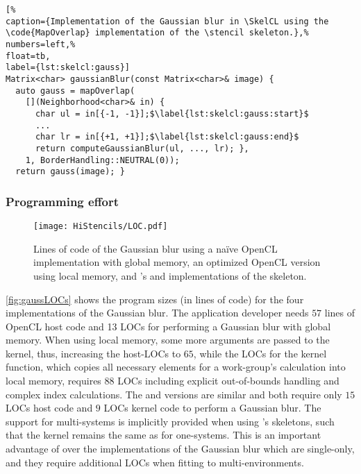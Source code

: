 \begin{lstlisting}[%                                                             
caption={Implementation of the Gaussian blur in \SkelCL using the \code{MapOverlap} implementation of the \stencil skeleton.},%
numbers=left,%
float=tb,
label={lst:skelcl:gauss}]
Matrix<char> gaussianBlur(const Matrix<char>& image) {
  auto gauss = mapOverlap(
    [](Neighborhood<char>& in) {
      char ul = in[{-1, -1}];$\label{lst:skelcl:gauss:start}$
      ...
      char lr = in[{+1, +1}];$\label{lst:skelcl:gauss:end}$
      return computeGaussianBlur(ul, ..., lr); },
    1, BorderHandling::NEUTRAL(0));
  return gauss(image); }
\end{lstlisting}

\subsubsection*{Programming effort}

\begin{figure}[tbp]
	\centering
	\texttt{[image: HiStencils/LOC.pdf]}
	\caption{Lines of code of the Gaussian blur using a na{\"i}ve OpenCL implementation with global memory, an optimized OpenCL version using local memory, and \SkelCL's  and  implementations of the \stencil skeleton.}
	\label{fig:gaussLOCs}
\end{figure} 

\autoref{fig:gaussLOCs} shows the program sizes (in lines of code) for the four implementations of the Gaussian blur. 
The application developer needs $57$ lines of OpenCL host code and 13 LOCs for performing a Gaussian blur with global memory. 
When using local memory, some more arguments are passed to the kernel, thus, increasing the host-LOCs to $65$, while the LOCs for the kernel function, which copies all necessary elements for a work-group's calculation into local memory, requires $88$ LOCs including explicit out-of-bounds handling and complex index calculations.
The  and  versions are similar and both require only $15$ LOCs host code and $9$ LOCs kernel code to perform a Gaussian blur. 
The support for multi-\GPU systems is implicitly provided when using \SkelCL's skeletons, such that the kernel remains the same as for one-\GPU systems.
This is an important advantage of \SkelCL over the \OpenCL implementations of the Gaussian blur which are single-\GPU only, and they require additional LOCs when fitting to multi-\GPU environments.

